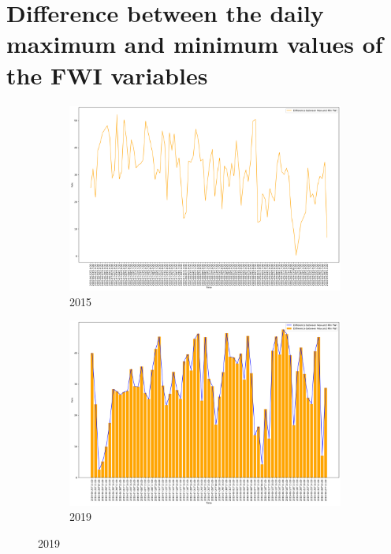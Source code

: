 \FloatBarrier

\section{Difference between the daily maximum and minimum values of the FWI variables}

\begin{figure}[h]
	\centering
	\caption{Daily difference of max and min FWI values}
	\begin{subfigure}{0.45\textwidth}
		\centering
		\includegraphics[width=\textwidth]{graphs/2015/byHour/FWI_DIFFmaxMin.png}
		\caption{2015}
	\end{subfigure}
	\hfill
	\begin{subfigure}{0.45\textwidth}
		\centering
		\includegraphics[width=\textwidth]{graphs/2019/byHour/FWI_DIFFmaxMin.png}
		\caption{2019}

\end{subfigure}
\end{figure}
